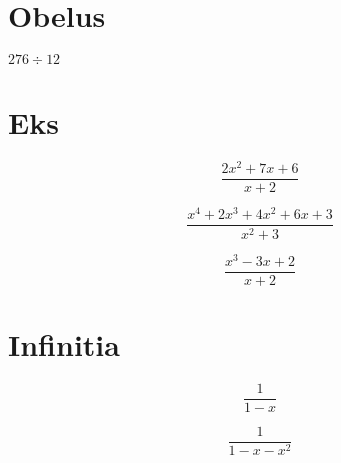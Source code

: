 \documentclass[letterpaper,12pt]{article}
\begin{document}
	\section{Obelus}
		\begin{minipage}{0.5\textwidth}
			\begin{minipage}{0.25\textwidth}
				$276 \div 12$
			\end{minipage}
			\begin{minipage}{0.75\textwidth}
			\end{minipage}
		\end{minipage}
	\section{Eks}
		\begin{center}
			\[\frac{2x^2 + 7x + 6}{x+2}\]

			\hspace{2cm}
		\end{center}
		\begin{center}
			\[\frac{x^4 + 2x^3 + 4x^2 + 6x + 3}{x^2+3}\]

			\hspace{2cm}
		\end{center}
		\begin{center}
			\[\frac{x^3 - 3x + 2}{x + 2}\]

			\hspace{2cm}
		\end{center}
	\section{Infinitia}
		\begin{center}
			\[\frac{1}{1-x}\]


		\end{center}
		\begin{center}
			\[\frac{1}{1-x-x^2}\]


		\end{center}
\end{document}
